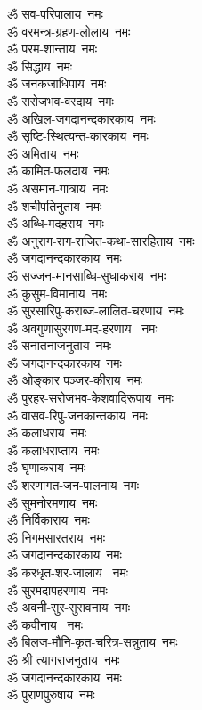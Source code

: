 \begin{flushleft}
\begin{multicols}{2}
ॐ सव-परिपालाय~नमः\hfill{}\\
ॐ वरमन्त्र-ग्रहण-लोलाय~नमः\\
ॐ परम-शान्ताय~नमः\\
ॐ सिद्धाय~नमः\\
ॐ जनकजाधिपाय~नमः\\
ॐ सरोजभव-वरदाय~नमः\\
ॐ अखिल-जगदानन्दकारकाय~नमः\\
ॐ सृष्टि-स्थित्यन्त-कारकाय~नमः\\
ॐ अमिताय~नमः\\
ॐ कामित-फलदाय~नमः\\
ॐ असमान-गात्राय~नमः\hfill{}\\
ॐ शचीपतिनुताय~नमः\\
ॐ अब्धि-मदहराय~नमः\\
ॐ अनुराग-राग-राजित-कथा-सारहिताय~नमः\\
ॐ जगदानन्दकारकाय~नमः\\
ॐ सज्जन-मानसाब्धि-सुधाकराय~नमः\\
ॐ कुसुम-विमानाय~नमः\\
ॐ सुरसारिपु-कराब्ज-लालित-चरणाय~नमः\\
ॐ अवगुणासुरगण-मद-हरणाय ~नमः\\
ॐ सनातनाजनुताय~नमः\\
ॐ जगदानन्दकारकाय~नमः\hfill{}\\
ॐ ओङ्कार पञ्जर-कीराय~नमः\\
ॐ पुरहर-सरोजभव-केशवादिरूपाय~नमः\\
ॐ वासव-रिपु-जनकान्तकाय~नमः\\
ॐ कलाधराय~नमः\\
ॐ कलाधराप्ताय~नमः\\
ॐ घृणाकराय~नमः\\
ॐ शरणागत-जन-पालनाय~नमः\\
ॐ सुमनोरमणाय~नमः\\
ॐ निर्विकाराय~नमः\\
ॐ निगमसारतराय~नमः\hfill{}\\
ॐ जगदानन्दकारकाय~नमः\\
ॐ करधृत-शर-जालाय ~नमः\\
ॐ सुरमदापहरणाय~नमः\\
ॐ अवनी-सुर-सुरावनाय~नमः\\
ॐ कवीनाय ~नमः\\
ॐ बिलज-मौनि-कृत-चरित्र-सन्नुताय~नमः\\
ॐ श्री त्यागराजनुताय~नमः\\
ॐ जगदानन्दकारकाय~नमः\\
ॐ पुराणपुरुषाय~नमः\\

\end{multicols}
\end{flushleft}
